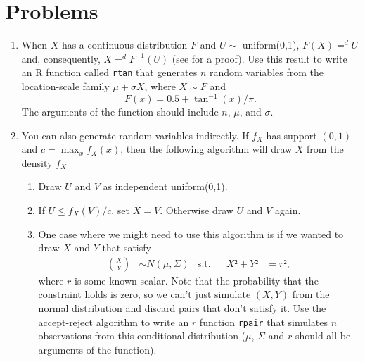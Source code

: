 

\chapter{Problems}

\begin{enumerate}

\item When $X$ has a continuous distribution $F$ and $U ∼$
  uniform(0,1), $F(X) =^d U$ and, consequently, $X =^d F^{-1}(U)$ (see
  \citealt[Theorem 2.1.10]{CB02} for a proof).  Use this result to
  write an R function called \texttt{rtan} that generates $n$ random
  variables from the location-scale family $μ + σ X$, where $X ∼ F$
  and
  \begin{equation}
    \label{eq:1}
    F(x) = 0.5 + \tan^{-1}(x)/π.
  \end{equation}
  The arguments of the function should include $n$, $μ$, and $σ$.

\item You can also generate random variables indirectly.  If $f_X$ has
  support $(0,1)$ and $c = \max_x f_X(x)$, then the following
  algorithm will draw $X$ from the density $f_X$ \citep[see][Section
  5.6.2]{CB02}
  \begin{enumerate}
  \item Draw $U$ and $V$ as independent uniform(0,1).
  \item If $U ≤ f_X(V) / c$, set $X = V$.  Otherwise draw $U$ and $V$
    again.
  \item One case where we might need to use this algorithm is if we
    wanted to draw $X$ and $Y$ that satisfy
    \begin{align}\label{eq:prob_1}
      \binom{X}{Y} &∼ N(μ,Σ) & \text{s.t.}&& X² + Y² &= r²,
    \end{align}
    where $r$ is some known scalar.  Note that the probability that
    the constraint holds is zero, so we can't just simulate $(X,Y)$
    from the normal distribution and discard pairs that don't satisfy
    it.  Use the accept-reject algorithm to write an $r$ function
    \texttt{rpair} that simulates $n$ observations from this
    conditional distribution ($μ$, $Σ$ and $r$ should all be arguments
    of the function).
  \end{enumerate}


\end{enumerate}
